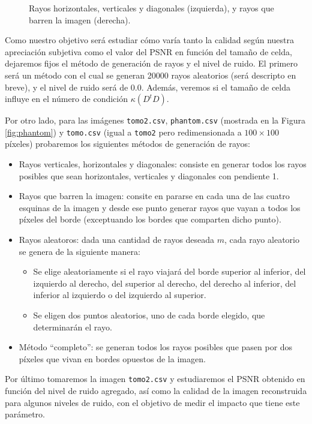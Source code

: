 \documentclass[a4paper]{article}
\begin{document}
\begin{figure}
\begin{tikzpicture}[scale=0.5]
\end{tikzpicture}
\caption{Rayos horizontales, verticales y diagonales (izquierda), y rayos que barren la imagen (derecha).}
\end{figure}

Como nuestro objetivo será estudiar cómo varía tanto la calidad según 
nuestra apreciación subjetiva como el valor del PSNR en función del tamaño de celda, dejaremos fijos el método de generación de rayos y el nivel de 
ruido. El primero será un método con el cual se generan 20000 rayos aleatorios (será descripto en breve), y el nivel de ruido será de 0.0. Además, 
veremos si el tamaño de celda influye en el número de condición $\kappa(D^tD)$.

Por otro lado, para las imágenes \texttt{tomo2.csv}, \texttt{phantom.csv} (mostrada en la Figura \ref{fig:phantom}) y \texttt{tomo.csv} (igual a 
\texttt{tomo2} pero redimensionada a $100 \times 100$ píxeles) probaremos los siguientes métodos de generación de rayos:

\begin{itemize}
\item Rayos verticales, horizontales y diagonales: consiste en generar todos los rayos posibles que sean horizontales, verticales y diagonales 
con pendiente 1.
\item Rayos que barren la imagen: consite en pararse en cada una de las cuatro esquinas de la imagen y desde ese punto generar rayos que vayan 
a todos los píxeles del borde (exceptuando los bordes que comparten dicho punto).
\item Rayos aleatoros: dada una cantidad de rayos deseada $m$, cada rayo aleatorio se genera de la siguiente manera:
\begin{itemize}
\item Se elige aleatoriamente si el rayo viajará del borde superior al inferior, del izquierdo al derecho, del superior al derecho, del derecho 
al inferior, del inferior al izquierdo o del izquierdo al superior.
\item Se eligen dos puntos aleatorios, uno de cada borde elegido, que determinarán el rayo.
\end{itemize}
\item Método ``completo'': se generan todos los rayos posibles que pasen por dos píxeles que vivan en bordes opuestos de la imagen.
\end{itemize}

Por último tomaremos la imagen \texttt{tomo2.csv} y estudiaremos el PSNR obtenido en función del nivel de ruido agregado, así como la calidad 
de la imagen reconstruida para algunos niveles de ruido, con el objetivo de medir el impacto que tiene este parámetro.
\end{document}
